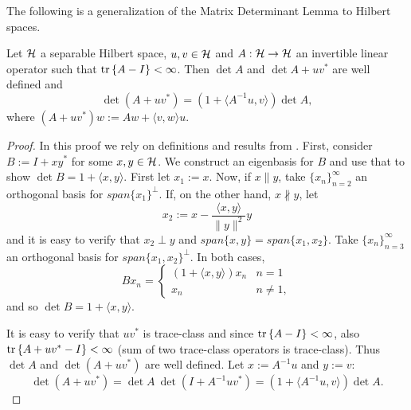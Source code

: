 \documentclass{siamonline220329}
\begin{document}
The following is a generalization of the Matrix Determinant Lemma to
Hilbert spaces.
\begin{lemma}%
  Let $\mathcal{H}$ a separable Hilbert space, $u,v\in \mathcal{H}$ and $A: \mathcal{H} \to
  \mathcal{H}$ an invertible linear operator such that $\textup{tr}\left \{A-I \right \} <
  \infty$. Then $\det A$ and $\det A + uv^*$ are well defined and
  \begin{equation*}
    \det (A + uv^*) = (1 + \langle A^{-1} u, v \rangle ) \det A,
  \end{equation*}
  where $(A + uv^*)w := Aw + \langle v,w \rangle u$.
\end{lemma}
\begin{proof}
  In this proof we rely on definitions and results from
  \cite{simon1977}. First, consider $B := I + xy^*$ for some $x,y \in
  \mathcal{H}$. We construct an eigenbasis for $B$ and use that to show $\det
  B = 1 + \langle x, y \rangle$. First let $x_1 := x$.  Now, if $x
  \parallel y$, take $\{x_n \}_{n=2}^{\infty}$ an orthogonal basis for
  $span\{x_1\} ^{\perp}$. If, on the other hand, $x \not \parallel y$, let
  \begin{equation*}
    x_2 := x - \frac{ \langle x, y\rangle}{\|y\|^2}y
  \end{equation*}
  and it is easy to verify that $x_2 \perp y$ and $span \{x,y\} = span
  \{x_1,x_2\}$. Take $\{x_n \}_{n=3}^{\infty}$ an orthogonal basis for
  $span\{x_1,x_2\} ^{\perp}$. In both cases,
  \begin{equation*}
    B x_n =
    \begin{cases}
      (1 + \langle x, y \rangle) x_n & n = 1 \\
      x_n                            & n \neq 1,
    \end{cases}
  \end{equation*}
  and so $\det B = 1 + \langle x, y \rangle$.
  
  It is easy to verify that $uv^*$ is trace-class and since $\textup{tr}\left \{A-I \right \}
  < \infty$, also $\textup{tr}\left \{A + uv^* - I \right \} < \infty$ (sum of two trace-class
  operators is trace-class). Thus $\det A$ and $\det (A+uv^*)$ are
  well defined. Let $x:=A^{-1}u$ and $y := v$:
  \begin{equation*}
    \det (A + uv^*) = \det A \ \det(I+A^{-1}uv^*) =
    (1 + \langle A^{-1}u, v \rangle) \det A .
  \end{equation*}
\end{proof}




\end{document}
